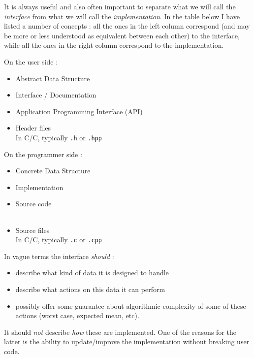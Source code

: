 \documentclass[12pt]{article}
\theoremstyle{plain}
\theoremstyle{remark}
\newcommand{\cpp}{C\nolinebreak\hspace{-.05em}\raisebox{.4ex}{\tiny\bf +}\nolinebreak\hspace{-.10em}\raisebox{.4ex}{\tiny\bf +}}
\begin{document}
It is always useful and also often important to separate what we will call the 
{\it interface} from what we will call the {\it implementation}. In the table
below I have listed a number of concepts : all the ones in the left column
correspond (and may be more or less understood as equivalent between each
other) to the interface, while all the ones in the right column correspond to
the implementation.

\medskip

\begin{center}
	\begin{minipage}[t]{0.45\textwidth}
	On the user side :
	\begin{itemize}
		\item Abstract Data Structure
		\item Interface / Documentation
		\item Application Programming Interface (API)
		\item Header files\\
			In C/\cpp, typically {\tt .h} or {\tt .hpp}
	\end{itemize}
\end{minipage}
	\begin{minipage}[t]{0.45\textwidth}
	On the programmer side :
	\begin{itemize}
		\item Concrete Data Structure
		\item Implementation
		\item Source code\\\mbox{ }
		\item Source files\\In C/\cpp, typically {\tt .c} or {\tt .cpp}
	\end{itemize}
\end{minipage}
\end{center}

In vague terms the interface {\it should} : 
\begin{itemize}
	\item describe what kind of data it is designed to handle
	\item describe what actions on this data it can perform
	\item possibly offer some guarantee about algorithmic complexity of
		some of these actions (worst case, expected mean, etc).
\end{itemize}

It should {\it not} describe {\it how} these are implemented. One of the reasons
for the latter is the ability to update/improve the implementation without
breaking user code.
\end{document}
